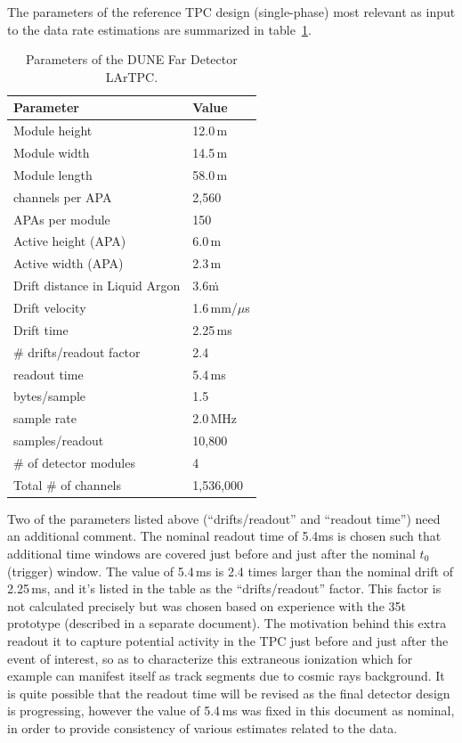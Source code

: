 The parameters of the reference TPC design (single-phase) most relevant as input to the data rate estimations are summarized in
table~\ref{tab:fundamental-parameters}.

\begin{table}[ht!]
	\centering
	\caption{Parameters of the DUNE Far Detector LArTPC.}
	\label{tab:fundamental-parameters}
	\begin{tabular}{| p{2.5in} | p{1in} |}
		\hline
		\textbf{Parameter} & \textbf{Value} \\ \hline
		Module height & 12.0\,m \\ \hline
		Module width  & 14.5\,m \\ \hline
		Module length  & 58.0\,m \\ \hline
		\hline
		channels per APA & 2,560 \\ \hline
		APAs per module & 150 \\ \hline
		Active height (APA) & 6.0\,m \\ \hline
		Active width (APA) & 2.3\,m \\ \hline  \hline
		Drift distance in Liquid Argon & 3.6\.m \\
		\hline
		Drift velocity & 1.6\,mm/$\mu$s \\ \hline
		Drift time & 2.25\,ms \\ \hline
		\# drifts/readout factor & 2.4 \\ \hline
		readout time & 5.4\,ms \\ \hline \hline
		bytes/sample & 1.5 \\ \hline
		sample rate & 2.0\,MHz \\ \hline
		samples/readout & 10,800 \\
		\hline \hline
		\# of detector modules & 4 \\ \hline
		Total \# of channels & 1,536,000 \\
		\hline
	\end{tabular}
\end{table}

Two of the parameters listed above (``drifts/readout'' and ``readout time'') need an additional comment.
The nominal readout time of 5.4ms is chosen such that additional time windows are covered just before and just
after the nominal $t_0$ (trigger) window. The value of 5.4\,ms is 2.4 times larger than the nominal drift of 2.25\,ms,
and it's listed in the table as the ``drifts/readout'' factor. This factor is not calculated precisely but was chosen based
on experience with the 35t prototype (described in a separate document). The motivation behind this extra readout it to capture
potential activity in the TPC just before and just after the event of interest, so as to characterize this extraneous
ionization which for example can manifest itself as track segments due to cosmic rays background. It is quite
possible that the readout time will be revised as the final detector design is progressing, however the value of 5.4\,ms
was fixed in this document as nominal, in order to provide consistency of various estimates related to the data.


